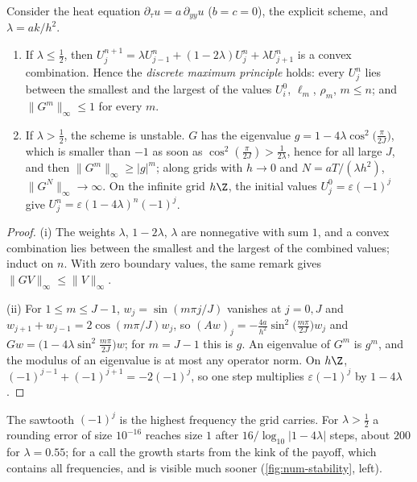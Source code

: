 \begin{proposition}\label{prop:num-explicit-stability}
Consider the heat equation $\partial_\tau u=a\,\partial_{yy}u$ ($b=c=0$), the explicit scheme, and
$\lambda=ak/h^2$.
\begin{enumerate}[label=(\roman*)]
  \item If $\lambda\le\frac12$, then $U^{n+1}_j=\lambda U^n_{j-1}+(1-2\lambda)U^n_j+\lambda U^n_{j+1}$ is a
    convex combination. Hence the \emph{discrete maximum principle} holds: every $U^n_j$ lies between
    the smallest and the largest of the values $U^0_i$, $\ell_m$, $\rho_m$, $m\le n$; and
    $\|G^m\|_\infty\le1$ for every $m$.
  \item If $\lambda>\frac12$, the scheme is unstable. $G$ has the eigenvalue
    $g=1-4\lambda\cos^2\big(\frac\pi{2J}\big)$, which is smaller than $-1$ as soon as
    $\cos^2(\frac\pi{2J})>\frac1{2\lambda}$, hence for all large $J$, and then $\|G^m\|_\infty\ge|g|^m$; along
    grids with $h\to0$ and $N=aT/(\lambda h^2)$, $\|G^N\|_\infty\to\infty$. On the infinite grid $h\Z$, the
    initial values $U^0_j=\varepsilon(-1)^j$ give $U^n_j=\varepsilon(1-4\lambda)^n(-1)^j$.
\end{enumerate}
\end{proposition}

\begin{proof}
(i) The weights $\lambda$, $1-2\lambda$, $\lambda$ are nonnegative with sum $1$, and a convex combination lies
between the smallest and the largest of the combined values; induct on $n$. With zero boundary
values, the same remark gives $\|GV\|_\infty\le\|V\|_\infty$.

(ii) For $1\le m\le J-1$, $w_j=\sin(m\pi j/J)$ vanishes at $j=0,J$ and $w_{j+1}+w_{j-1}=2\cos(m\pi/J)w_j$, so
$(Aw)_j=-\frac{4a}{h^2}\sin^2\big(\frac{m\pi}{2J}\big)w_j$ and $Gw=\big(1-4\lambda\sin^2\frac{m\pi}{2J}\big)w$; for
$m=J-1$ this is $g$. An eigenvalue of $G^m$ is $g^m$, and the modulus of an eigenvalue is at most any
operator norm. On $h\Z$, $(-1)^{j-1}+(-1)^{j+1}=-2(-1)^j$, so one step multiplies $\varepsilon(-1)^j$ by $1-4\lambda$.
\end{proof}

The sawtooth $(-1)^j$ is the highest frequency the grid carries. For $\lambda>\frac12$ a rounding error of
size $10^{-16}$ reaches size $1$ after $16/\log_{10}|1-4\lambda|$ steps, about $200$ for $\lambda=0.55$; for a
call the growth starts from the kink of the payoff, which contains all frequencies, and is visible
much sooner (\cref{fig:num-stability}, left).

